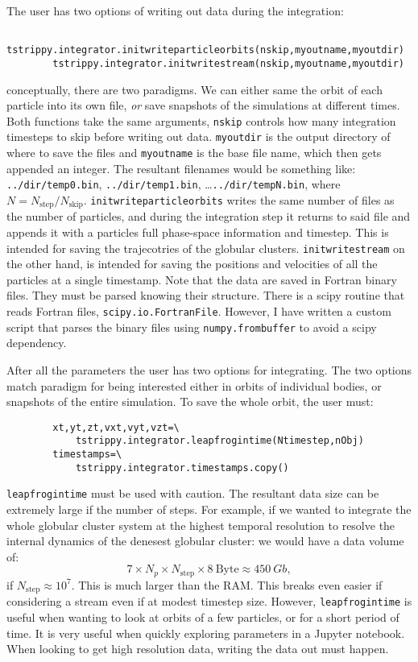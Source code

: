 \documentclass{article}
\begin{document}
    The user has two options of writing out data during the integration:
    \begin{lstlisting}
        tstrippy.integrator.initwriteparticleorbits(nskip,myoutname,myoutdir)
        tstrippy.integrator.initwritestream(nskip,myoutname,myoutdir)
    \end{lstlisting}
    conceptually, there are two paradigms. We can either same the orbit of each particle into its own file, \textit{or} save snapshots of the simulations at different times. Both functions take the same arguments, \texttt{nskip} controls how many integration timesteps to skip before writing out data. \texttt{myoutdir} is the output directory of where to save the files and \texttt{myoutname} is the base file name, which then gets appended an integer. The resultant filenames would be something like: \texttt{../dir/temp0.bin}, \texttt{../dir/temp1.bin}, \dots \texttt{../dir/tempN.bin}, where $N=N_\mathrm{step}/N_\mathrm{skip}$. \texttt{initwriteparticleorbits} writes the same number of files as the number of particles, and during the integration step it returns to said file and appends it with a particles full phase-space information and timestep. This is intended for saving the trajecotries of the globular clusters. \texttt{initwritestream} on the other hand, is intended for saving the positions and velocities of all the particles at a single timestamp. Note that the data are saved in Fortran binary files. They must be parsed knowing their structure. There is a scipy routine that reads Fortran files, \texttt{scipy.io.FortranFile}. However, I have written a custom script that parses the binary files using \texttt{numpy.frombuffer} to avoid a scipy dependency. 

    After all the parameters the user has two options for integrating. The two options match paradigm for being interested either in orbits of individual bodies, or snapshots of the entire simulation. To save the whole orbit, the user must:
    \small
    \begin{lstlisting}
        xt,yt,zt,vxt,vyt,vzt=\
            tstrippy.integrator.leapfrogintime(Ntimestep,nObj) 
        timestamps=\
            tstrippy.integrator.timestamps.copy()
    \end{lstlisting}
    \normalsize
    \texttt{leapfrogintime} must be used with caution. The resultant data size can be extremely large if the number of steps. For example, if we wanted to integrate the whole globular cluster system at the highest temporal resolution to resolve the internal dynamics of the denesest globular cluster: we would have a data volume of:
    \begin{equation}
        7 \times N_p \times N_\mathrm{step} \times 8~\mathrm{Byte} \approx 450~Gb,
    \end{equation}
    if $N_\mathrm{step}\approx 10^7$. This is much larger than the RAM. This breaks even easier if considering a stream even if at modest timestep size. However, \texttt{leapfrogintime} is useful when wanting to look at orbits of a few particles, or for a short period of time. It is very useful when quickly exploring parameters in a Jupyter notebook. When looking to get high resolution data, writing the data out must happen.  
\end{document}
